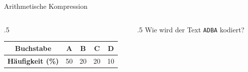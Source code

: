 \begin{frame}[fragile]{Arithmetische Kompression}
\vspace{-.5cm}
\begin{columns}
\begin{column}{.5\textwidth}
\begin{table}[H]
\centering
\footnotesize
\begin{tabular}{c||c|c|c|c}
\textbf{Buchstabe} & A & B & C & D \\\midrule
\textbf{Häufigkeit (\%)} & 50 & 20 & 20 & 10 \\
\end{tabular}
\end{table}
\end{column}
\begin{column}{.5\textwidth}
Wie wird der Text \texttt{ADBA} kodiert?
\end{column}
\end{columns}
\vspace{-.5cm}
\newcommand{\arithmeticTikz}[7]{
    \draw (0,#1) -- (10,#1);   
	
	
    \foreach \i in {1,...,4}{
	    \pgfmathsetmacro{\inc}{#2[\i-1]} %
	    \pgfmathsetmacro{\xStart}{#3[\i-1]} %
	    \pgfmathsetmacro{\xEnd}{\xStart+\inc} %
	    \pgfmathsetmacro{\l}{#4[\i-1]} %

        \draw (\xStart*10,#1+0.2) to (\xStart*10,#1-0.2);
        \draw (\xEnd*10,#1+0.2) to (\xEnd*10,#1-0.2);
        
        \node (\l-Perc) at (\xStart*10,#1-0.4) {\fpeval{round(((1-\xStart)*#6+#7*\xStart),4)}};
        \node (\l-PercEnd) at (\xEnd*10,#1-0.4) {\fpeval{round(((1-\xEnd)*#6+#7*\xEnd),4)}};
        
}}
\end{frame}
